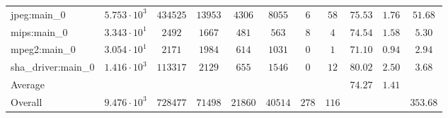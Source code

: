 \begin{tabular}{|l|c|c|c|c|c|c|c|c|c|c|}
jpeg:main\_0            & $ 5.753 \cdot 10^{3} $ & $ 434525 $ & $ 13953 $ & $ 4306  $ & $ 8055  $ & $ 6   $ & $ 58  $ & $ 75.53       $ & $ 1.76    $ & $ 51.68   $ \\
mips:main\_0            & $ 3.343 \cdot 10^{1} $ & $ 2492   $ & $ 1667  $ & $ 481   $ & $ 563   $ & $ 8   $ & $ 4   $ & $ 74.54       $ & $ 1.58    $ & $ 5.30    $ \\
mpeg2:main\_0           & $ 3.054 \cdot 10^{1} $ & $ 2171   $ & $ 1984  $ & $ 614   $ & $ 1031  $ & $ 0   $ & $ 1   $ & $ 71.10       $ & $ 0.94    $ & $ 2.94    $ \\
sha\_driver:main\_0     & $ 1.416 \cdot 10^{3} $ & $ 113317 $ & $ 2129  $ & $ 655   $ & $ 1546  $ & $ 0   $ & $ 12  $ & $ 80.02       $ & $ 2.50    $ & $ 3.68    $ \\
\hline
Average                 & $                    $ & $        $ & $       $ & $       $ & $       $ & $     $ & $     $ & $ 74.27       $ & $ 1.41    $ & $         $ \\
\hline
Overall                 & $ 9.476 \cdot 10^{3} $ & $ 728477 $ & $ 71498 $ & $ 21860 $ & $ 40514 $ & $ 278 $ & $ 116 $ & $             $ & $         $ & $ 353.68  $ \\
\hline
\end{tabular}
